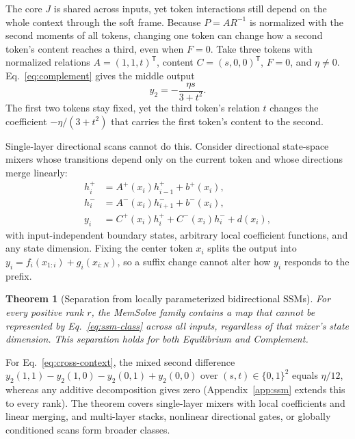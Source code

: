 \documentclass[10pt,twocolumn]{article}
\newtheorem{theorem}{Theorem}[section]
\newcommand{\T}{\mathsf{T}}
\begin{document}
The core $J$ is shared across inputs, yet token interactions still depend on
the whole context through the soft frame.
Because $P=AR^{-1}$ is normalized with the second moments of all tokens,
changing one token can change how a second token's content reaches a third,
even when $F=0$.
Take three tokens with normalized relations $A=(1,1,t)^\T$, content
$C=(s,0,0)^\T$, $F=0$, and $\eta\ne0$.
Eq.~\eqref{eq:complement} gives the middle output
\begin{equation}
 y_2=-\frac{\eta s}{3+t^2}.
 \label{eq:cross-context}
\end{equation}
The first two tokens stay fixed, yet the third token's relation $t$ changes the
coefficient $-\eta/(3+t^2)$ that carries the first token's content to the
second.

Single-layer directional scans cannot do this.
Consider directional state-space mixers \cite{zhu2024vim,liu2024vmamba} whose
transitions depend only on the current token and whose directions merge
linearly:
\begin{equation}
 \begin{aligned}
 h_i^+&=A^+(x_i)h_{i-1}^++b^+(x_i),\\
 h_i^-&=A^-(x_i)h_{i+1}^-+b^-(x_i),\\
 y_i&=C^+(x_i)h_i^++C^-(x_i)h_i^-+d(x_i),
 \end{aligned}
 \label{eq:ssm-class}
\end{equation}
with input-independent boundary states, arbitrary local coefficient functions,
and any state dimension.
Fixing the center token $x_i$ splits the output into
$y_i=f_i(x_{1:i})+g_i(x_{i:N})$, so a suffix change cannot alter how $y_i$
responds to the prefix.

\begin{theorem}[Separation from locally parameterized bidirectional SSMs]
\label{thm:ssm}
For every positive rank $r$, the MemSolve family contains a map that cannot
be represented by Eq.~\eqref{eq:ssm-class} across all inputs, regardless of
that mixer's state dimension. This separation holds for both Equilibrium and
Complement.
\end{theorem}

For Eq.~\eqref{eq:cross-context}, the mixed second difference
$y_2(1,1)-y_2(1,0)-y_2(0,1)+y_2(0,0)$ over $(s,t)\in\{0,1\}^2$ equals
$\eta/12$, whereas any additive decomposition gives zero
(Appendix~\ref{app:ssm} extends this to every rank).
The theorem covers single-layer mixers with local coefficients and linear
merging, and multi-layer stacks, nonlinear directional gates, or globally
conditioned scans form broader classes.
\end{document}
